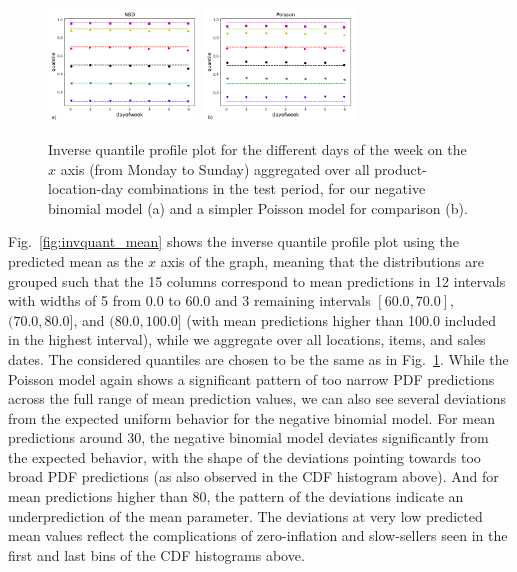 \documentclass[BCOR=1mm, DIV=calc,10pt,
twoside=true,
twocolumn,
headings=normal]{scrartcl}
\newcommand{\fig}{Fig.~}
\begin{document}
\begin{figure}
\begin{center}
\includegraphics[width=4cm]{figs/invquant_dayofweek_nbinom}
\includegraphics[width=4cm]{figs/invquant_dayofweek_poisson}
\caption{\label{fig:invquant_dayofweek} Inverse quantile profile plot for the different days of the week on the $x$ axis (from Monday to Sunday) aggregated over all product-location-day combinations in the test period, for our negative binomial model (a) and a simpler Poisson model for comparison (b).}
\end{center}
\end{figure}

\fig \ref{fig:invquant_mean} shows the inverse quantile profile plot using the predicted mean as the $x$ axis of the graph, meaning that the distributions are grouped such that the 15 columns correspond to mean predictions in 12 intervals with widths of 5 from 0.0 to 60.0 and 3 remaining intervals $[60.0, 70.0]$, $(70.0, 80.0]$, and $(80.0, 100.0]$ (with mean predictions higher than 100.0 included in the highest interval), while we aggregate over all locations, items, and sales dates. The considered quantiles are chosen to be the same as in \fig \ref{fig:invquant_dayofweek}. While the Poisson model again shows a significant pattern of too narrow PDF predictions across the full range of mean prediction values, we can also see several deviations from the expected uniform behavior for the negative binomial model. For mean predictions around $30$, the negative binomial model deviates significantly from the expected behavior, with the shape of the deviations pointing towards too broad PDF predictions (as also observed in the CDF histogram above). And for mean predictions higher than $80$, the pattern of the deviations indicate an underprediction of the mean parameter. The deviations at very low predicted mean values reflect the complications of zero-inflation and slow-sellers seen in the first and last bins of the CDF histograms above.
\end{document}
